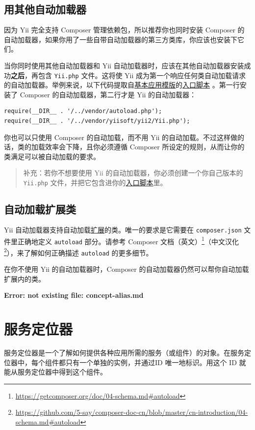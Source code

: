 \subsection{用其他自动加载器 \label{concept-autoloading.md::using-other-autoloaders}}
因为 Yii 完全支持 Composer 管理依赖包，所以推荐你也同时安装 Composer 的自动加载器，如果你用了一些自带自动加载器的第三方类库，你应该也安装下它们。

当你同时使用其他自动加载器和 Yii 自动加载器时，应该在其他自动加载器安装成功\textbf{之后}，再包含 \lstinline|Yii.php| 文件。这将使 Yii 成为第一个响应任何类自动加载请求的自动加载器。举例来说，以下代码提取自\hyperref[start-basic.md]{基本应用模版}的\hyperref[structure-entry-scripts.md]{入口脚本} 。第一行安装了 Composer 的自动加载器，第二行才是 Yii 的自动加载器：

\lstset{language=php}\begin{lstlisting}
require(__DIR__ . '/../vendor/autoload.php');
require(__DIR__ . '/../vendor/yiisoft/yii2/Yii.php');
\end{lstlisting}
你也可以只使用 Composer 的自动加载，而不用 Yii 的自动加载。不过这样做的话，类的加载效率会下降，且你必须遵循 Composer 所设定的规则，从而让你的类满足可以被自动加载的要求。

\begin{quote}补充：若你不想要使用 Yii 的自动加载器，你必须创建一个你自己版本的 \lstinline|Yii.php| 文件，并把它包含进你的\hyperref[structure-entry-scripts.md]{入口脚本}里。

\end{quote}
\subsection{自动加载扩展类 \label{concept-autoloading.md::autoloading-extension-classes}}
Yii 自动加载器支持自动加载\hyperref[structure-extensions.md]{扩展}的类。唯一的要求是它需要在 \lstinline|composer.json| 
文件里正确地定义 \lstinline|autoload| 部分。请参考 Composer 文档（英文）\footnote{\url{https://getcomposer.org/doc/04-schema.md\#autoload}}（中文汉化\footnote{\url{https://github.com/5-say/composer-doc-cn/blob/master/cn-introduction/04-schema.md\#autoload}}），来了解如何正确描述 \lstinline|autoload| 的更多细节。

在你不使用 Yii 的自动加载器时，Composer 的自动加载器仍然可以帮你自动加载扩展内的类。



\newpage\label{concept-alias.md}\textbf{Error: not existing file: concept-alias.md}\newpage
\label{concept-service-locator.md}\section{服务定位器}
服务定位器是一个了解如何提供各种应用所需的服务（或组件）的对象。在服务定位器中，每个组件都只有一个单独的实例，并通过ID 唯一地标识。用这个 ID 就能从服务定位器中得到这个组件。

